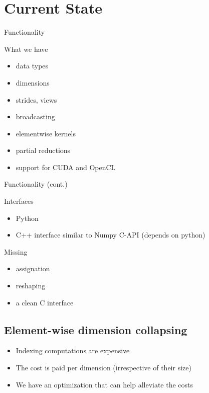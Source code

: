 \documentclass[utf8x,xcolor=pdftex,dvipsnames,table]{beamer}
\begin{document}
\section{Current State}

\begin{frame}{Functionality}
\begin{block}{What we have}
\begin{itemize}
\item data types
\item dimensions
\item strides, views
\item broadcasting
\item elementwise kernels
\item partial reductions
\item support for CUDA and OpenCL
\end{itemize}
\end{block}
\end{frame}

\begin{frame}{Functionality (cont.)}
\begin{block}{Interfaces}
\begin{itemize}
\item Python
\item C++ interface similar to Numpy C-API (depends on python)
\end{itemize}
\end{block}
\begin{block}{Missing}
\begin{itemize}
\item assignation
\item reshaping
\item a clean C interface
\end{itemize}
\end{block}
\end{frame}

\subsection{Element-wise dimension collapsing}

\begin{frame}
\begin{itemize}
\item Indexing computations are expensive
\item The cost is paid per dimension (irrespective of their size)
\item We have an optimization that can help alleviate the costs
\end{itemize}
\end{frame}
\end{document}
